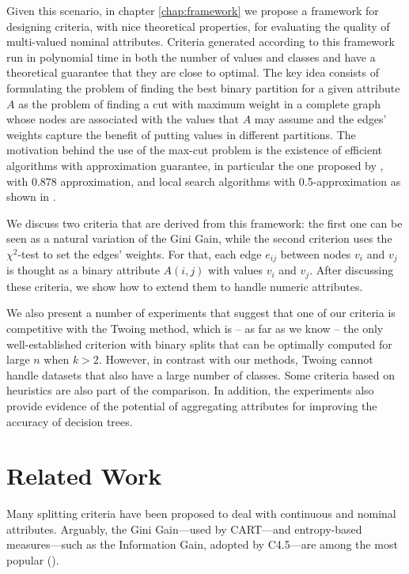 Given this scenario,  in chapter \ref{chap:framework} we propose
a framework for designing criteria, with nice theoretical properties, for evaluating the quality of 
 multi-valued nominal attributes.
Criteria generated according to this framework
run in polynomial time in both the number of values and classes and
have a theoretical guarantee that they are close to optimal.
The key idea consists of formulating the problem
of finding the best binary partition for a given attribute $A$ as the  problem of finding a 
cut with maximum weight  in a complete graph whose nodes are associated with the values that $A$ may assume and the edges' weights capture the benefit of putting
values in different partitions. The  motivation behind the use of the max-cut problem is 
the existence of efficient algorithms with 
approximation guarantee, in particular 
the one proposed  by \cite{GoeWil95}, with $0.878$ approximation,
and  local search  algorithms with 0.5-approximation as shown in \cite{journals/corr/AngelBPW16}.


We discuss two criteria that are derived from this framework:
the first one  can be seen as a natural variation of the
Gini Gain, while the second criterion uses the $\chi^2$-test  to set the edges' weights. For that, each
edge $e_{ij}$ between nodes  $v_i$ and $v_j$
is thought as a binary attribute $A(i,j)$ with values $v_i$ and $v_j$.
After discussing these criteria, we show how to extend them to handle
numeric attributes.

We also  present a number of experiments 
that suggest that one of our  criteria 
is  competitive with the Twoing method, which 
is -- as far as we know -- the only well-established
criterion with binary splits that can be optimally computed for large $n$ when $k > 2$.
However, in contrast with our methods, Twoing cannot handle
datasets that also have a large number of classes. Some criteria based on heuristics are also part of the comparison.
In addition, the experiments also  provide 
evidence of the potential of aggregating  attributes for improving
the accuracy of decision trees.

\section{Related Work}
\label{chap:relatedwork}

Many splitting criteria have been proposed to 
deal with continuous and nominal attributes.
Arguably, the Gini Gain---used by CART---and entropy-based measures---such as 
the Information Gain, adopted by C4.5---are among
the most popular (\cite{books/sp/datamining2005/RokachM05,
Loh2014,series/sbcs/BarrosCF15}).

